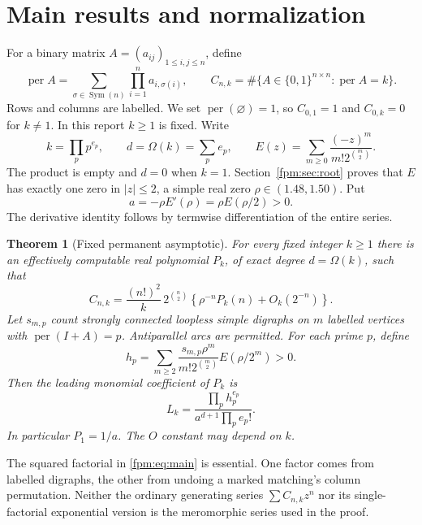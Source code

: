 \documentclass[11pt]{article}
\newtheorem{theorem}{Theorem}[section]
\theoremstyle{definition}\newtheorem{definition}[theorem]{Definition}
\theoremstyle{remark}\newtheorem{remark}[theorem]{Remark}
\newcommand{\Per}{\operatorname{per}}
\begin{document}
\newpage
{\small\tableofcontents}
\newpage

\section{Main results and normalization}\label{fpm:sec:results}
For a binary matrix $A=(a_{ij})_{1\le i,j\le n}$, define
\[
 \Per A=\sum_{\sigma\in\operatorname{Sym}(n)}\prod_{i=1}^n a_{i,\sigma(i)},
 \qquad C_{n,k}=\#\{A\in\{0,1\}^{n\times n}:\Per A=k\}.
\]
Rows and columns are labelled. We set $\Per(\varnothing)=1$, so $C_{0,1}=1$ and $C_{0,k}=0$ for $k\ne1$. In this report $k\ge1$ is fixed. Write
\[
 k=\prod_p p^{e_p},\qquad d=\Omega(k)=\sum_p e_p,
 \qquad E(z)=\sum_{m\ge0}\frac{(-z)^m}{m!2^{\binom m2}}.
\]
The product is empty and $d=0$ when $k=1$. Section~\ref{fpm:sec:root} proves that $E$ has exactly one zero in $|z|\le2$, a simple real zero $\rho\in(1.48,1.50)$. Put
\begin{equation}\label{fpm:eq:a}
 a=-\rho E'(\rho)=\rho E(\rho/2)>0.
\end{equation}
The derivative identity follows by termwise differentiation of the entire series.

\begin{theorem}[Fixed permanent asymptotic]\label{fpm:thm:main}
For every fixed integer $k\ge1$ there is an effectively computable real polynomial $P_k$, of exact degree $d=\Omega(k)$, such that
\begin{equation}\label{fpm:eq:main}
 C_{n,k}=\frac{(n!)^2}{k}\,2^{\binom n2}
 \left\{\rho^{-n}P_k(n)+O_k(2^{-n})\right\}.
\end{equation}
Let $s_{m,p}$ count strongly connected loopless simple digraphs on $m$ labelled vertices with $\Per(I+A)=p$. Antiparallel arcs are permitted. For each prime $p$, define
\begin{equation}\label{fpm:eq:hp}
 h_p=\sum_{m\ge2}\frac{s_{m,p}\rho^m}{m!2^{\binom m2}}
 E(\rho/2^m)>0.
\end{equation}
Then the leading monomial coefficient of $P_k$ is
\begin{equation}\label{fpm:eq:leading}
 L_k=\frac{\prod_p h_p^{e_p}}{a^{d+1}\prod_p e_p!}.
\end{equation}
In particular $P_1=1/a$. The $O$ constant may depend on $k$.
\end{theorem}

The squared factorial in \eqref{fpm:eq:main} is essential. One factor comes from labelled digraphs, the other from undoing a marked matching's column permutation. Neither the ordinary generating series $\sum C_{n,k}z^n$ nor its single-factorial exponential version is the meromorphic series used in the proof.
\end{document}
